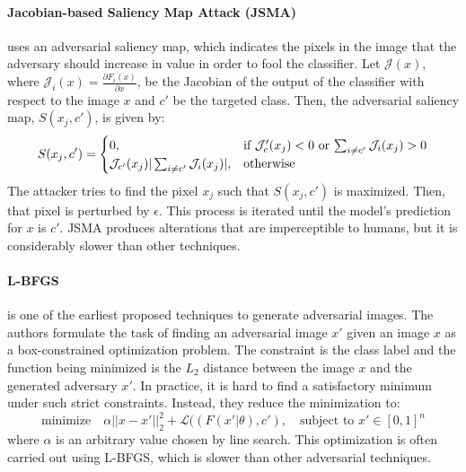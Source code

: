 \paragraph{Jacobian-based Saliency Map Attack (JSMA)} \cite{Carlini2017TowardsET}
uses an adversarial saliency map, which indicates the pixels in the image that the adversary should increase in value in order to fool the classifier.
Let $\mathcal{J}(x)$, where  $\mathcal{J}_i(x) = \frac{\partial F_{i}(x)}{\partial x} $, be the Jacobian of the output of the classifier with respect to the image $x$ and $c'$ be the targeted class.
Then, the adversarial saliency map, $S(x_j,c')$, is given by: 
\[
 S(x_j,c') = \begin{cases} 
            0, & \text{if $\mathcal{J}_c'(x_j)<0$}$ or $\sum_{i \neq c'} \mathcal{J}_i(x_j) > 0 \\
           \mathcal{J}_{c'}(x_j) | \sum_{i \neq c'} \mathcal{J}_i(x_j) |, & \text{otherwise}
          \end{cases}
\]
The attacker tries to find the pixel {$x_j$} such that $S(x_j,c')$ is maximized. 
Then, that pixel is perturbed by $\epsilon$. 
This process is iterated until the model's prediction for $x$ is $c'$. 
JSMA produces alterations that are imperceptible to humans, but it is considerably slower than other techniques.

\paragraph{L-BFGS} \cite{Szegedy2013IntriguingPO} is one of the earliest proposed techniques to generate adversarial images.
The authors formulate the task of finding an adversarial image $x'$ given an image $x$ as a box-constrained optimization problem.
The constraint is the class label and the function being minimized is the $L_2$ distance between the image $x$ and the generated adversary $x'$.
In practice, it is hard to find a satisfactory minimum under such strict constraints. Instead, they reduce the minimization to:
\[
\text{minimize} \quad \alpha || x - x' ||_2^2 + \mathcal{L}((F(x'|\theta),c'),\quad \text{subject to } x' \in [0,1]^n 
\]
where $\alpha$ is an arbitrary value chosen by line search. 
This optimization is often carried out using L-BFGS, which is slower than other adversarial techniques.

